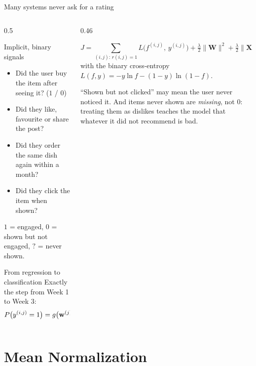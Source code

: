 \documentclass[aspectratio=169,10pt]{beamer}
\begin{document}
\begin{frame}{Many systems never ask for a rating}
  \begin{columns}[T,onlytextwidth]
    \begin{column}{0.5\textwidth}
      \begin{block}{Implicit, binary signals}
        \footnotesize
        \begin{itemize}
          \item Did the user buy the item after seeing it? ($1$ / $0$)
          \item Did they like, favourite or share the post?
          \item Did they order the same dish again within a month?
          \item Did they click the item when shown?
        \end{itemize}
        $1$ = engaged, $0$ = shown but not engaged, $?$ = never shown.
      \end{block}
      \begin{block}{From regression to classification}
        \footnotesize Exactly the step from Week 1 to Week 3:
        \[ P\bigl(y^{(i,j)} = 1\bigr) = g\bigl(\mathbf{w}^{(j)}\cdot\mathbf{x}^{(i)} + b^{(j)}\bigr),
           \quad g(z)=\tfrac{1}{1+e^{-z}} \]
      \end{block}
    \end{column}
    \begin{column}{0.46\textwidth}
      \begin{defnbox}
        \small
        \[ J = \!\!\sum_{(i,j):\,r(i,j)=1}\!\! L\bigl(f^{(i,j)},\,y^{(i,j)}\bigr)
           + \tfrac{\lambda}{2}\|\mathbf{W}\|^2 + \tfrac{\lambda}{2}\|\mathbf{X}\|^2 \]
        with the binary cross-entropy
        $L(f,y) = -y\ln f - (1-y)\ln(1-f)$.
      \end{defnbox}
      \begin{pitfall}
        \footnotesize ``Shown but not clicked'' may mean the user never noticed it. And
        items never shown are \emph{missing}, not $0$: treating them as dislikes teaches
        the model that whatever it did not recommend is bad.
      \end{pitfall}
    \end{column}
  \end{columns}
\end{frame}

\section{Mean Normalization}
\end{document}
